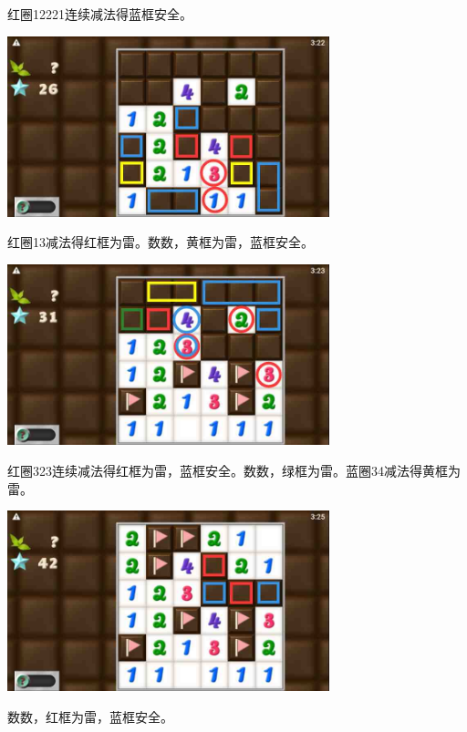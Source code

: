 红圈12221连续减法得蓝框安全。
\begin{center}
    \includegraphics[width=0.7\textwidth]{puzzlelow/239-4.jpg}
\end{center}
红圈13减法得红框为雷。数数，黄框为雷，蓝框安全。
\begin{center}
    \includegraphics[width=0.7\textwidth]{puzzlelow/239-5.jpg}
\end{center}
红圈323连续减法得红框为雷，蓝框安全。数数，绿框为雷。蓝圈34减法得黄框为雷。
\begin{center}
    \includegraphics[width=0.7\textwidth]{puzzlelow/239-6.jpg}
\end{center}
数数，红框为雷，蓝框安全。

